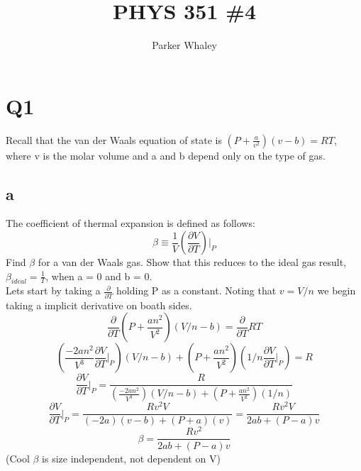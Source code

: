 \documentclass[10pt,a4paper]{article}
\author{Parker Whaley}
\title{PHYS 351 \#4}
\begin{document}
\maketitle

\section{Q1}
Recall that the van der Waals equation of state is $(P +\frac{a}{v^2} )(v - b) = RT$, where v is
the molar volume and a and b depend only on the type of gas.
\subsection{a}
The coefficient of thermal expansion is defined as follows:
\[\beta \equiv \frac{1}{V}(\frac{\partial V}{\partial T})\biggr |_P\]
Find $\beta$ for a van der Waals gas. Show that this reduces to the ideal gas result, $\beta_{ideal} =\frac{1}{T}$, when a = 0 and b = 0.\\

Lets start by taking a $\frac{\partial}{\partial T}$ holding P as a constant.  Noting that $v=V/n$ we begin taking a implicit derivative on boath sides.
\[\frac{\partial}{\partial T}(P +\frac{an^2}{V^2} )(V/n - b) = \frac{\partial}{\partial T}RT\]
\[(\frac{-2an^2}{V^3}\frac{\partial V}{\partial T}\biggr |_P )(V/n - b)+(P +\frac{an^2}{V^2} )(1/n\frac{\partial V}{\partial T}\biggr |_P) = R\]
\[\frac{\partial V}{\partial T}\biggr |_P =\frac{R}{(\frac{-2an^2}{V^3})(V/n - b)+(P +\frac{an^2}{V^2} )(1/n)}\]
\[\frac{\partial V}{\partial T}\biggr |_P =\frac{Rv^2V}{(-2a)(v - b)+(P +a )(v)}=  \frac{Rv^2V}{2ab+(P-a)v}\]
\[\beta=\frac{Rv^2}{2ab+(P-a)v}\]
(Cool $\beta$ is size independent, not dependent on V)
\end{document}
